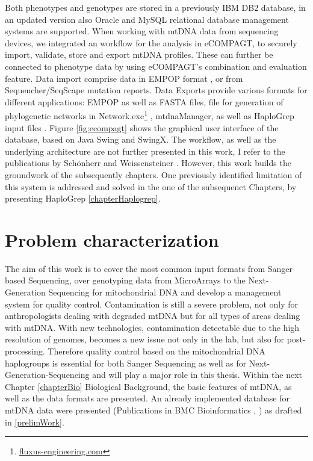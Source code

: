 Both phenotypes and genotypes are stored in a previously IBM DB2 database, in an updated version also Oracle and MySQL relational database management systems are supported. When working with mtDNA data from sequencing devices, we integrated an workflow for the analysis in eCOMPAGT, to securely import, validate, store and export mtDNA profiles.  These can further be connected to phenotype data by using eCOMPAGT's combination and evaluation feature. Data import comprise data in EMPOP format \cite{Parson2007}, or from Sequencher/SeqScape mutation reports. Data Exports provide various formats for different applications: EMPOP as well as FASTA files, file for generation of phylogenetic networks in Network.exe\footnote{\url{fluxus-engineering.com}}  \cite{Bandelt1999}, mtdnaManager\cite{Lee2008}, as well as HaploGrep input files \cite{Kloss-Brandstatter2011,Weissensteiner2016a}. Figure \ref{fig:ecompagt} shows the graphical user interface of the database, based on Java Swing and SwingX. The workflow, as well as the underlying architecture are not further presented in this work, I refer to the publications by Sch\"onherr and Weissensteiner \cite{Schoenherr2009,Weissensteiner2010}. However, this work builds the groundwork of the subsequently chapters. One previously identified limitation of this system is addressed and solved in the one of the subsequenct Chapters, by presenting HaploGrep \ref{chapterHaplogrep}.


\section{Problem characterization}
\label{sect:ProblChar}
The aim of this work is to cover the most common input formats from Sanger based Sequencing, over genotyping data from MicroArrays to the Next-Generation Sequencing for mitochondrial DNA and develop a management system for quality control. Contamination is still a severe problem, not only for anthropologists dealing with degraded mtDNA but for all types of areas dealing with mtDNA. With new technologies, contamination detectable due to the high resolution of genomes, becomes a new issue not only in the lab, but also for post-processing. Therefore quality control based on the mitochondrial DNA haplogroups is essential for both Sanger Sequencing as well as for Next-Generation-Sequencing and will play a major role in this thesis. Within the next Chapter \ref{chapterBio} Biological Background, the basic features of mtDNA, as well as the data formats are presented. An already implemented database for mtDNA data were presented (Publications in BMC Bioinformatics \cite{Schoenherr2009}, \cite{Weissensteiner2010}) as drafted in \ref{prelimWork}. 

